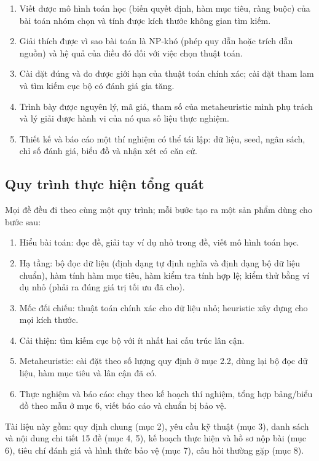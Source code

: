 \documentclass[a4paper,11pt]{article}
\begin{document}
\begin{enumerate}
\item Viết được mô hình toán học (biến quyết định, hàm mục tiêu, ràng buộc) của bài toán nhóm chọn và tính được kích thước không gian tìm kiếm.
\item Giải thích được vì sao bài toán là NP-khó (phép quy dẫn hoặc trích dẫn nguồn) và hệ quả của điều đó đối với việc chọn thuật toán.
\item Cài đặt đúng và đo được giới hạn của thuật toán chính xác; cài đặt tham lam và tìm kiếm cục bộ có đánh giá gia tăng.
\item Trình bày được nguyên lý, mã giả, tham số của metaheuristic mình phụ trách và lý giải được hành vi của nó qua số liệu thực nghiệm.
\item Thiết kế và báo cáo một thí nghiệm có thể tái lập: dữ liệu, seed, ngân sách, chỉ số đánh giá, biểu đồ và nhận xét có căn cứ.
\end{enumerate}
\subsection{Quy trình thực hiện tổng quát}
Mọi đề đều đi theo cùng một quy trình; mỗi bước tạo ra một sản phẩm dùng cho bước sau:

\begin{enumerate}
\item Hiểu bài toán: đọc đề, giải tay ví dụ nhỏ trong đề, viết mô hình toán học.
\item Hạ tầng: bộ đọc dữ liệu (định dạng tự định nghĩa và định dạng bộ dữ liệu chuẩn), hàm tính hàm mục tiêu, hàm kiểm tra tính hợp lệ; kiểm thử bằng ví dụ nhỏ (phải ra đúng giá trị tối ưu đã cho).
\item Mốc đối chiếu: thuật toán chính xác cho dữ liệu nhỏ; heuristic xây dựng cho mọi kích thước.
\item Cải thiện: tìm kiếm cục bộ với ít nhất hai cấu trúc lân cận.
\item Metaheuristic: cài đặt theo số lượng quy định ở mục 2.2, dùng lại bộ đọc dữ liệu, hàm mục tiêu và lân cận đã có.
\item Thực nghiệm và báo cáo: chạy theo kế hoạch thí nghiệm, tổng hợp bảng/biểu đồ theo mẫu ở mục 6, viết báo cáo và chuẩn bị bảo vệ.
\end{enumerate}
Tài liệu này gồm: quy định chung (mục 2), yêu cầu kỹ thuật (mục 3), danh sách và nội dung chi tiết 15 đề (mục 4, 5), kế hoạch thực hiện và hồ sơ nộp bài (mục 6), tiêu chí đánh giá và hình thức bảo vệ (mục 7), câu hỏi thường gặp (mục 8).
\end{document}
